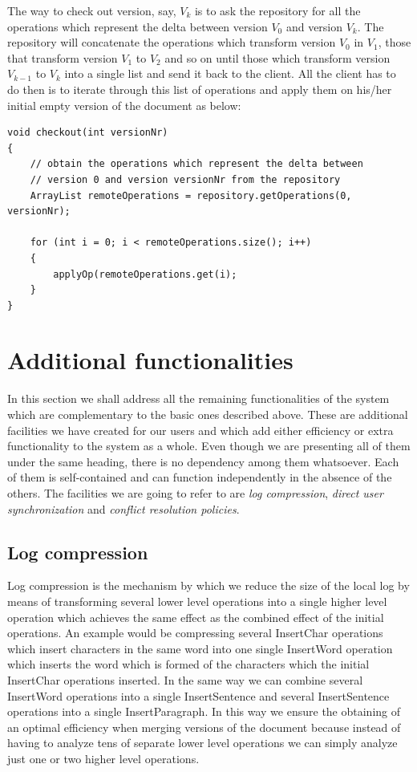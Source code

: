 The way to check out version, say, $V_{k}$ is to ask the repository for all the operations
which represent the delta between version $V_{0}$ and version $V_{k}$. The repository will concatenate
the operations which transform version $V_{0}$ in $V_{1}$, those that transform version $V_{1}$ to $V_{2}$
and so on until those which transform version $V_{k-1}$ to $V_{k}$ into a single list and send it back to
the client. All the client has to do then is to iterate through this list of operations and apply them on
his/her initial empty version of the document as below:

\begin{lstlisting}
void checkout(int versionNr)
{
	// obtain the operations which represent the delta between
	// version 0 and version versionNr from the repository
	ArrayList remoteOperations = repository.getOperations(0, versionNr);
	
	for (int i = 0; i < remoteOperations.size(); i++)
	{
		applyOp(remoteOperations.get(i);
	}
}
\end{lstlisting}

\section{Additional functionalities}

In this section we shall address all the remaining functionalities of the system which are complementary to
the basic ones described above. These are additional facilities we have created for our users and which
add either efficiency or extra functionality to the system as a whole. Even though we are presenting all
of them under the same heading, there is no dependency among them whatsoever. Each of them is self-contained
and can function independently in the absence of the others. The facilities we are going to refer to are
\emph{log compression}, \emph{direct user synchronization} and \emph{conflict resolution policies}.

\subsection{Log compression}
\label{sec:compress}

Log compression is the mechanism by which we reduce the size of the local log by means of transforming
several lower level operations into a single higher level operation which achieves the same effect as
the combined effect of the initial operations. An example would be compressing several InsertChar
operations which insert characters in the same word into one single InsertWord operation which inserts
the word which is formed of the characters which the initial InsertChar operations inserted. In the
same way we can combine several InsertWord operations into a single InsertSentence and several InsertSentence operations
into a single InsertParagraph. In this way we ensure the obtaining of an optimal efficiency when merging
versions of the document because instead of having to analyze tens of separate lower level operations we
can simply analyze just one or two higher level operations.

